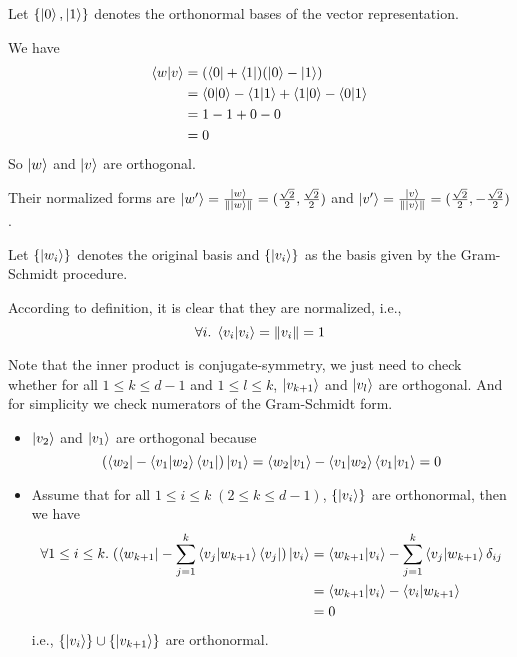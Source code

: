 \documentclass{homeworg}
\begin{document}
\exercise*

Let $\{\ket{0},\ket{1}\}$ denotes the orthonormal bases of the vector representation.

We have
\begin{align}
\braket{w|v}&=(\bra{0}+\bra{1})(\ket{0}-\ket{1})\nonumber\\
&=\braket{0|0}-\braket{1|1}+\braket{1|0}-\braket{0|1}\nonumber\\
&=1-1+0-0\nonumber\\
&=0\nonumber
\end{align}
So $\ket{w}$ and $\ket{v}$ are orthogonal.

Their normalized forms are $\ket{w^\prime}=\frac{\ket{w}}{\left\|\ket{w}\right\|}=(\frac{\sqrt{2}}{2},\frac{\sqrt{2}}{2})$ and $\ket{v^\prime}=\frac{\ket{v}}{\left\|\ket{v}\right\|}=(\frac{\sqrt{2}}{2},-\frac{\sqrt{2}}{2})$.

\exercise*
Let $\{\ket{w_i}\}$ denotes the original basis and $\{\ket{v_i}\}$ as the basis given by the Gram-Schmidt procedure.

According to definition, it is clear that they are normalized, i.e.,
\[\forall{i}.\;\braket{v_i|v_i}=\left\|v_i\right\|=1\]

Note that the inner product is conjugate-symmetry, we just need to check whether for all $1\leq k\leq d-1$ and $1\leq l\leq k$, $\ket{v_{k+1}}$ and $\ket{v_l}$ are orthogonal. And for simplicity we check numerators of the Gram-Schmidt form.

\begin{itemize}
    \item $\ket{v_2}$ and $\ket{v_1}$ are orthogonal because
    \[(\bra{w_2}-\braket{v_1|w_2}\bra{v_1})\ket{v_1}=\braket{w_2|v_1}-\braket{v_1|w_2}\braket{v_1|v_1}=0
    \]
    \item Assume that for all $1\leq i\leq k\;(2\leq k\leq d-1)$, $\{\ket{v_i}\}$ are orthonormal, then we have
    \begin{align}
        \forall 1\leq i\leq k.\;(\bra{w_{k+1}}-\sum_{j=1}^{k}\braket{v_j|w_{k+1}}\bra{v_j})\ket{v_i}&=\braket{w_{k+1}|v_i}-\sum_{j=1}^{k}\braket{v_j|w_{k+1}}\delta_{ij}\nonumber\\
        &=\braket{w_{k+1}|v_i}-\braket{v_i|w_{k+1}}\nonumber\\
        &=0\nonumber
    \end{align}
    i.e., $\{\ket{v_i}\}\cup\{\ket{v_{k+1}}\}$ are orthonormal.
    
\end{itemize}
\end{document}
